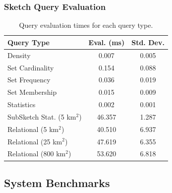 \subsubsection{Sketch Query Evaluation}
\begin{table}[h!]
    \renewcommand{\arraystretch}{1.3}
    \caption{Query evaluation times for each query type.}
    \label{tbl:query-times}
    \begin{center}
        \begin{tabular}{|l|c|c|}
            \hline
            \textbf{Query Type}      & \textbf{Eval. (ms)} & \textbf{Std. Dev.} \\
            \hline
            Density                  & 0.007                    & 0.005 \\
            \hline
            Set Cardinality          & 0.154                    & 0.088 \\
            \hline
            Set Frequency            & 0.036                    & 0.019 \\
            \hline
            Set Membership           & 0.015                    & 0.009 \\
            \hline
            Statistics               & 0.002                    & 0.001 \\
            \hline
            SubSketch Stat. (5 km$^2$)& 46.357                  & 1.287 \\
            \hline
            Relational (5 km$^2$)    & 40.510                   & 6.937 \\
            \hline
            Relational (25 km$^2$)   & 47.619                   & 6.355 \\
            \hline
            Relational (800 km$^2$)  & 53.620                   & 6.818 \\
            \hline
        \end{tabular}
    \end{center}
\end{table}



\subsection{System Benchmarks}

